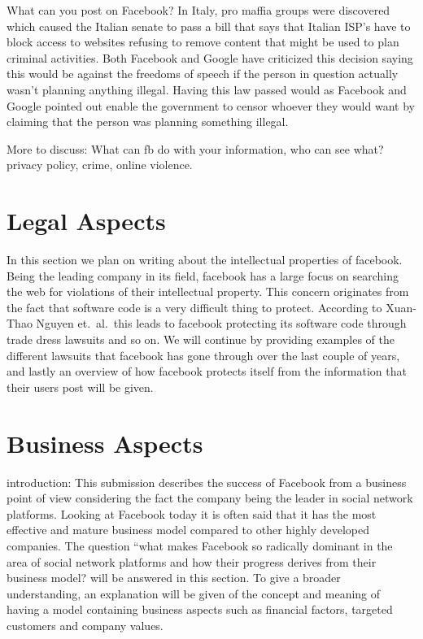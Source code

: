 \documentclass[conference]{IEEEtran}
\begin{document}
What can you post on Facebook?
In Italy, pro maffia groups were discovered which caused the Italian senate to
pass a bill that says that Italian ISP’s have to block access to websites
refusing to remove content that might be used to plan criminal activities. Both
Facebook and Google have criticized this decision saying this would be against
the freedoms of speech if the person in question actually wasn't planning
anything illegal.  Having this law passed would as Facebook and Google pointed
out enable the government to censor whoever they would want by claiming that
the person was planning something illegal. 

More to discuss:
What can fb do with your information, who can see what? privacy policy, crime,
online violence.

\section{Legal Aspects}
\label{legal}
In this section we plan on writing about the intellectual properties of
facebook. Being the leading company in its field, facebook has a large focus on
searching the web for violations of their intellectual property. This concern
originates from the fact that software code is a very difficult thing to
protect. According to  Xuan-Thao Nguyen et.\ al.\ this leads to facebook
protecting its software code through trade dress lawsuits and so on. We will
continue by providing examples of the different lawsuits that facebook has gone
through over the last couple of years, and lastly an overview of how facebook
protects itself from the information that their users post will be given.

\section{Business Aspects}
\label{financial}

introduction:
This submission describes the success of Facebook from a business point of view
considering the fact the company being the leader in social network platforms.
Looking at Facebook today it is often said that it has the most effective and
mature business model compared to other highly developed companies. The
question “what makes Facebook so radically dominant in the area of social
network platforms and how their progress derives from their business model?
will be answered in this section. To give a broader understanding, an
explanation will be given of the concept and meaning of having a model
containing business aspects such as financial factors, targeted customers and
company values.
\end{document}
